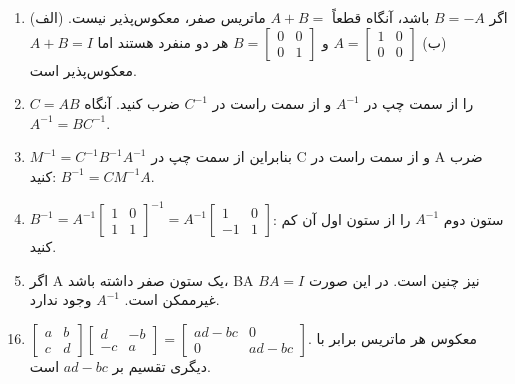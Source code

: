 \documentclass[12pt,a4paper]{article}
\begin{document}
{\begin{enumerate}
			\item (الف) اگر $B=-A$ باشد، آنگاه قطعاً $A+B=$ ماتریس صفر، معکوس‌پذیر نیست.
			(ب) $A=\begin{bmatrix} 1 & 0 \\ 0 & 0 \end{bmatrix}$ و $B=\begin{bmatrix} 0 & 0 \\ 0 & 1 \end{bmatrix}$ هر دو منفرد هستند اما $A+B=I$ معکوس‌پذیر است.
			
			\item $C=AB$ را از سمت چپ در $A^{-1}$ و از سمت راست در $C^{-1}$ ضرب کنید. آنگاه $A^{-1}=BC^{-1}$.
			
			\item $M^{-1} = C^{-1}B^{-1}A^{-1}$ بنابراین از سمت چپ در C و از سمت راست در A ضرب کنید: $B^{-1}=CM^{-1}A$.
			
			\item $B^{-1} = A^{-1} \begin{bmatrix} 1 & 0 \\ 1 & 1 \end{bmatrix}^{-1} = A^{-1} \begin{bmatrix} 1 & 0 \\ -1 & 1 \end{bmatrix}$: ستون دوم $A^{-1}$ را از ستون اول آن کم کنید.
			
			\item اگر A یک ستون صفر داشته باشد، BA نیز چنین است. در این صورت $BA=I$ غیرممکن است. $A^{-1}$ وجود ندارد.
		\end{enumerate}
		
		
		\begin{enumerate}
			\setcounter{enumi}{15}
			\item $\begin{bmatrix} a & b \\ c & d \end{bmatrix} \begin{bmatrix} d & -b \\ -c & a \end{bmatrix} = \begin{bmatrix} ad-bc & 0 \\ 0 & ad-bc \end{bmatrix}$. معکوس هر ماتریس برابر با دیگری تقسیم بر $ad-bc$ است.
			

\end{enumerate}}
\end{document}

